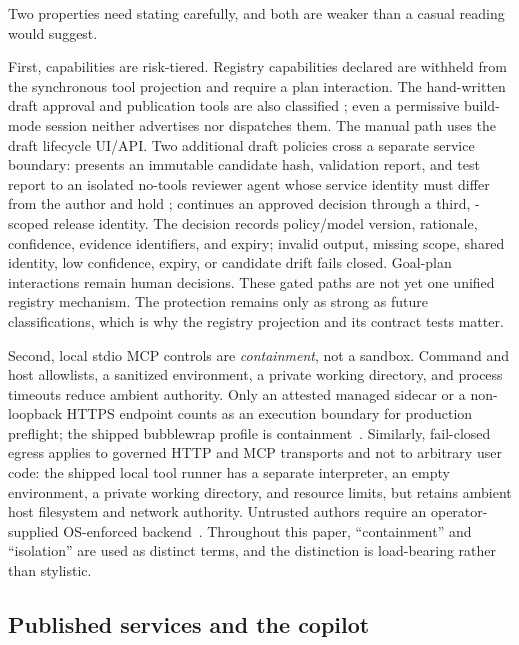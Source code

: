 Two properties need stating carefully, and both are weaker than a casual reading
would suggest.

First, \aria{} capabilities are risk-tiered. Registry capabilities declared
 are withheld from the synchronous tool projection and require a plan
interaction. The hand-written draft approval and publication tools are also
classified ; even a permissive build-mode session neither advertises nor
dispatches them. The manual path uses the draft lifecycle UI/API. Two additional
draft policies cross a separate service boundary:  presents an
immutable candidate hash, validation report, and test report to an isolated
no-tools reviewer agent whose service identity must differ from the author and hold
\approver{};  continues an approved decision through a third,
\operator{}-scoped release identity. The decision records policy/model version,
rationale, confidence, evidence identifiers, and expiry; invalid output, missing
scope, shared identity, low confidence, expiry, or candidate drift fails closed.
Goal-plan  interactions remain human decisions. These gated paths are
not yet one unified registry mechanism. The protection remains only as
strong as future classifications, which is why the registry projection and its
contract tests matter.

Second, local stdio MCP controls are \emph{containment}, not a sandbox. Command and
host allowlists, a sanitized environment, a private working directory, and process
timeouts reduce ambient authority. Only an attested managed sidecar or a
non-loopback HTTPS endpoint counts as an execution boundary for production
preflight; the shipped bubblewrap profile is containment~\cite{bubblewrap}.
Similarly, fail-closed egress applies to governed HTTP and MCP transports and not
to arbitrary user code: the shipped local tool runner has a separate interpreter,
an empty environment, a private working directory, and resource limits, but retains
ambient host filesystem and network authority. Untrusted authors require an
operator-supplied OS-enforced backend~\cite{agache2020firecracker}. Throughout this
paper, ``containment'' and ``isolation'' are used as distinct terms, and the
distinction is load-bearing rather than stylistic.

\subsection{Published services and the copilot}

